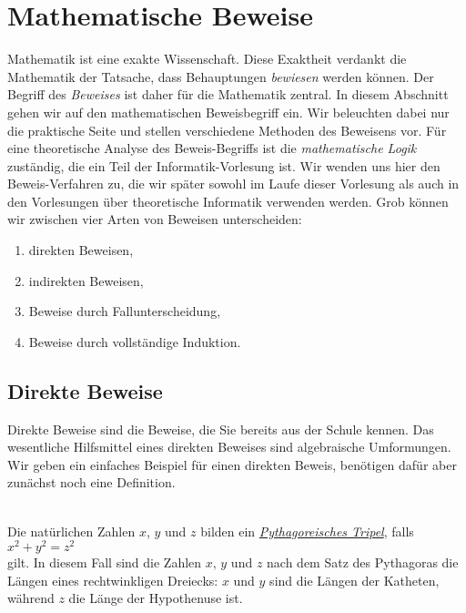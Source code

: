 \chapter{Mathematische Beweise}
Mathematik ist eine exakte Wissenschaft. Diese Exaktheit verdankt die Mathematik der
Tatsache, dass Behauptungen \emph{bewiesen} werden k\"{o}nnen.  Der Begriff des \emph{Beweises} 
ist daher f\"{u}r die Mathematik zentral.  
In diesem Abschnitt gehen wir auf den mathematischen Beweisbegriff ein.  Wir beleuchten dabei nur die
praktische Seite und stellen verschiedene Methoden des Beweisens vor.  F\"{u}r eine theoretische Analyse des
Beweis-Begriffs ist die \emph{mathematische Logik} zust\"{a}ndig, die ein Teil der Informatik-Vorlesung ist.
Wir wenden uns hier den Beweis-Verfahren zu, die wir sp\"ater sowohl im Laufe dieser Vorlesung als
auch in den Vorlesungen \"uber theoretische Informatik verwenden werden.  Grob k\"{o}nnen wir
zwischen vier Arten von Beweisen unterscheiden: 
\begin{enumerate}
\item direkten Beweisen,
\item indirekten Beweisen,
\item Beweise durch Fallunterscheidung, 
\item Beweise durch vollst\"{a}ndige Induktion.
\end{enumerate}

\section{Direkte Beweise}
Direkte Beweise sind die Beweise, die Sie bereits aus der Schule kennen.  Das wesentliche Hilfsmittel eines direkten Beweises
sind algebraische Umformungen.  Wir geben ein einfaches Beispiel f\"{u}r einen
direkten Beweis, ben\"{o}tigen daf\"{u}r aber zun\"{a}chst noch eine Definition.


\begin{Definition} \hspace*{\fill} \\
Die nat\"urlichen Zahlen $x$, $y$ und $z$ bilden ein
\href{https://de.wikipedia.org/wiki/Pythagoreisches_Tripel}{\emph{Pythagoreisches Tripel}}, falls
\\[0.2cm]
\hspace*{1.3cm}
$x^2 + y^2 = z^2$
\\[0.2cm]
gilt.  In diesem Fall sind die Zahlen $x$, $y$ und $z$ nach dem Satz des Pythagoras die L\"{a}ngen eines
rechtwinkligen Dreiecks:  $x$ und $y$ sind die L\"{a}ngen der Katheten, w\"{a}hrend $z$ die L\"{a}nge der Hypothenuse
ist.
\end{Definition}

